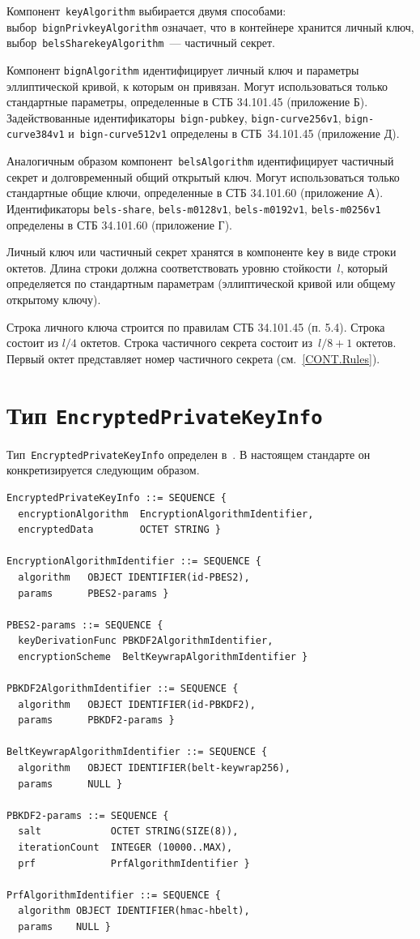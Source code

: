 Компонент~\texttt{keyAlgorithm} выбирается двумя способами:
выбор~\texttt{bignPrivkeyAlgorithm} означает, что в контейнере хранится личный 
ключ, выбор~\texttt{belsSharekeyAlgorithm}~--- частичный секрет. 

Компонент \texttt{bignAlgorithm} идентифицирует личный ключ и параметры 
эллиптической кривой, к которым он привязан. Могут использоваться
только стандартные параметры, определенные в СТБ 34.101.45 (приложение Б). 
%
Задействованные идентификаторы~\texttt{bign-pubkey}, 
\texttt{bign-curve256v1}, \texttt{bign-curve384v1} 
и~\texttt{bign-curve512v1} определены в СТБ~34.101.45 (приложение Д).

Аналогичным образом компонент~\texttt{belsAlgorithm} идентифицирует 
частичный секрет и долговременный общий открытый ключ. 
Могут использоваться только стандартные общие ключи, 
определенные в СТБ 34.101.60 (приложение А). 
Идентификаторы \texttt{bels-share}, \texttt{bels-m0128v1}, 
\texttt{bels-m0192v1}, \texttt{bels-m0256v1} определены в СТБ 34.101.60 
(приложение Г).

Личный ключ или частичный секрет хранятся в компоненте \texttt{key}
в виде строки октетов. Длина строки должна соответствовать уровню
стойкости~$l$, который определяется по стандартным параметрам
(эллиптической кривой или общему открытому ключу).

Строка личного ключа строится по правилам СТБ 34.101.45 (п. 5.4). 
Строка состоит из $l/4$ октетов. 
%
Строка частичного секрета состоит из~$l/8+1$ октетов. 
Первый октет представляет номер частичного секрета (см.~\ref{CONT.Rules}).

\section{Тип \texttt{EncryptedPrivateKeyInfo}}\label{CONT.CT}

Тип~\texttt{EncryptedPrivateKeyInfo} определен в~\cite{PKCS5}. В настоящем
стандарте он конкретизируется следующим образом.

\begin{verbatim}
EncryptedPrivateKeyInfo ::= SEQUENCE {
  encryptionAlgorithm  EncryptionAlgorithmIdentifier,
  encryptedData        OCTET STRING }

EncryptionAlgorithmIdentifier ::= SEQUENCE {
  algorithm   OBJECT IDENTIFIER(id-PBES2),
  params      PBES2-params }

PBES2-params ::= SEQUENCE {
  keyDerivationFunc PBKDF2AlgorithmIdentifier,
  encryptionScheme  BeltKeywrapAlgorithmIdentifier }

PBKDF2AlgorithmIdentifier ::= SEQUENCE {
  algorithm   OBJECT IDENTIFIER(id-PBKDF2),
  params      PBKDF2-params }

BeltKeywrapAlgorithmIdentifier ::= SEQUENCE {
  algorithm   OBJECT IDENTIFIER(belt-keywrap256),
  params      NULL }

PBKDF2-params ::= SEQUENCE {
  salt            OCTET STRING(SIZE(8)),
  iterationCount  INTEGER (10000..MAX),
  prf             PrfAlgorithmIdentifier }

PrfAlgorithmIdentifier ::= SEQUENCE {
  algorithm OBJECT IDENTIFIER(hmac-hbelt), 
  params    NULL }

\end{verbatim}

